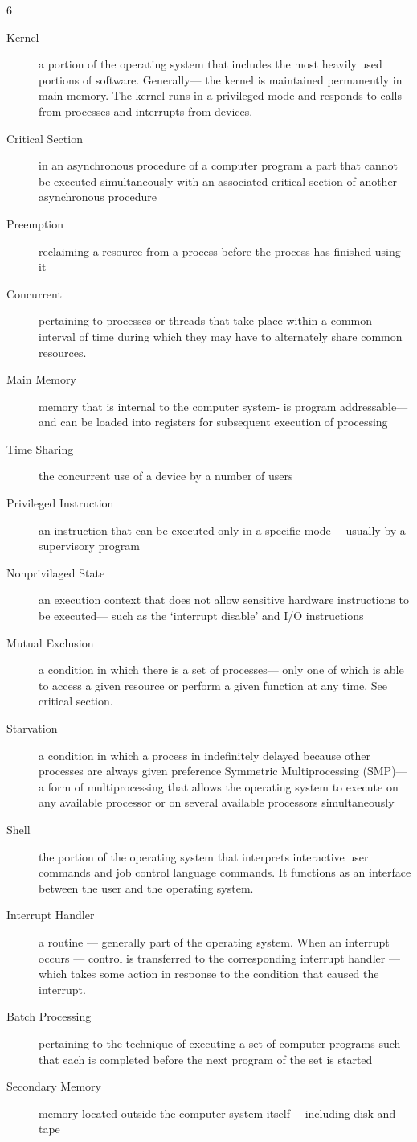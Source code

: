 \documentclass[9pt,landscape]{memoir}
\begin{document}
\begin{multicols}{6}
\miniscule
\begin{description}
    \item[Kernel] a portion of the operating system that includes the most heavily used portions of software. Generally— the kernel is maintained permanently in main memory. The kernel runs in a privileged mode and responds to calls from processes and interrupts from devices.
    \item[Critical Section] in an asynchronous procedure of a computer program a part that cannot be executed simultaneously with an associated critical section of another asynchronous procedure
    \item[Preemption] reclaiming a resource from a process before the process has finished using it
    \item[Concurrent] pertaining to processes or threads that take place within a common interval of time during which they may have to alternately share common resources.
    \item[Main Memory] memory that is internal to the computer system- is program addressable— and can be loaded into registers for subsequent execution of processing
    \item[Time Sharing] the concurrent use of a device by a number of users
    \item[Privileged Instruction] an instruction that can be executed only in a specific mode— usually by a supervisory program
    \item[Nonprivilaged State] an execution context that does not allow sensitive hardware instructions to be executed— such as the ‘interrupt disable’ and I/O instructions
    \item[Mutual Exclusion] a condition in which there is a set of processes— only one of which is able to access a given resource or perform a given function at any time. See critical section.
    \item[Starvation] a condition in which a process in indefinitely delayed because other processes are always given preference
    Symmetric Multiprocessing (SMP)— a form of multiprocessing that allows the operating system to execute on any available processor or on several available processors simultaneously
    \item[Shell] the portion of the operating system that interprets interactive user commands and job control language commands. It functions as an interface between the user and the operating system.
    \item[Interrupt Handler] a routine — generally part of the operating system. When an interrupt occurs — control is transferred to the corresponding interrupt handler — which takes some action in response to the condition that caused the interrupt.
    \item[Batch Processing] pertaining to the technique of executing a set of computer programs such that each is completed before the next program of the set is started
    \item[Secondary Memory] memory located outside the computer system itself— including disk and tape


\end{description}
\end{multicols}
\end{document}
